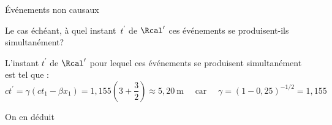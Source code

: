 \begin{exo}[PC][1][appli]{Événements non causaux}
  \begin{enonce}
    Le cas échéant, à quel instant~$t^{\prime}$ de $\Rcal^{\prime}$ ces événements se produisent-ils simultanément?

  \end{enonce}


  \begin{corrige}
    
    L’instant $t^{\prime}$ de $\Rcal^{\prime}$ pour lequel ces événements se produisent simultanément est tel que :
    $$
    c t^{\prime}=\gamma\left(c t_1-\beta x_1\right)=1,155\left(3+\frac{3}{2}\right) \approx 5,20 \mathrm{~m} \quad \text { car } \quad \gamma=(1-0,25)^{-1 / 2}=1,155
    $$
    
    On en déduit 
  \end{corrige}
\end{exo}



